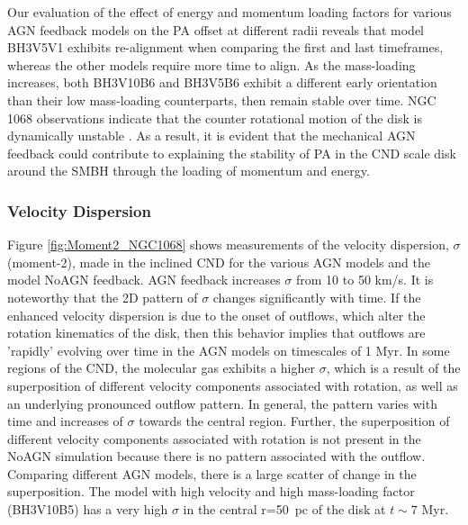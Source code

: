 \documentclass[fleqn,usenatbib]{mnras}
\begin{document}
Our evaluation of the effect of energy and momentum loading factors for various AGN feedback models on the PA offset at different radii reveals that model BH3V5V1 exhibits re-alignment when comparing the first and last timeframes, whereas the other models require more time to align. 
As the mass-loading increases, both BH3V10B6 and BH3V5B6 exhibit a different early orientation than their low mass-loading counterparts, then remain stable over time. NGC 1068 observations indicate that the counter rotational motion of the disk \citep[i.e PA offset across different scale radii of more than 150 degrees, e.g. see][]{Raouf2021} is dynamically unstable \citep{Garcia-Burillo2019}. As a result, it is evident that the mechanical AGN feedback could contribute to explaining the stability of PA in the CND scale disk around the SMBH through the loading of momentum and energy. 

\subsubsection{Velocity Dispersion}
Figure \ref{fig:Moment2_NGC1068} shows  measurements of the velocity dispersion, $\sigma$ (moment-2),  made in the inclined CND for the various AGN models and the model NoAGN feedback. AGN feedback increases $\sigma$ from 10 to 50 km/s. 
It is noteworthy that the 2D pattern of $\sigma$ changes significantly with time. If the enhanced velocity dispersion is due to the onset of outflows, which alter the rotation kinematics of the disk, then this behavior implies that outflows are 'rapidly' evolving over time in the AGN models on timescales of 1 Myr.
In some regions of the CND, the molecular gas exhibits a higher $\sigma$, which is a result of the superposition of different velocity components associated with rotation, as well as an underlying pronounced outflow pattern. 
In general, the pattern varies with  time and increases of $\sigma$ towards the central region. 
Further, the superposition of different velocity components associated with rotation is not present in the NoAGN simulation because there is no pattern associated with the outflow. Comparing different AGN models, there is a large scatter of change in the superposition. The model with high velocity and high mass-loading factor (BH3V10B5) has a very high $\sigma$ in the central r=50~pc of the disk at $t\sim7$ Myr. 
\end{document}
